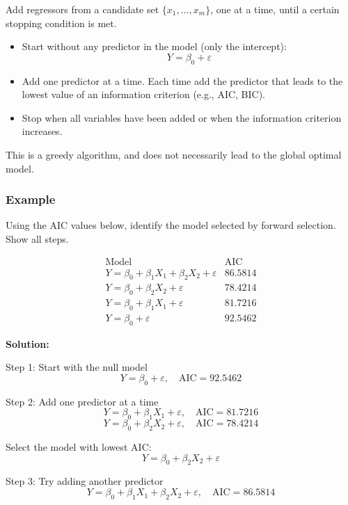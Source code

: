 Add regressors from a candidate set $\{x_1, \dots, x_m\}$, one at a time, until a certain stopping condition is met.

\begin{itemize}
\item Start without any predictor in the model (only the intercept):
\[
Y = \beta_0 + \varepsilon
\]

\item Add one predictor at a time. Each time add the predictor that leads to the lowest value of an information criterion (e.g., AIC, BIC).

\item Stop when all variables have been added or when the information criterion increases.
\end{itemize}

This is a greedy algorithm, and does not necessarily lead to the global optimal model.

\subsubsection*{Example}

Using the AIC values below, identify the model selected by forward selection. Show all steps.

\[
\begin{array}{c|c}
\text{Model} & \text{AIC} \\
\hline
Y = \beta_0 + \beta_1 X_1 + \beta_2 X_2 + \varepsilon & 86.5814 \\
Y = \beta_0 + \beta_2 X_2 + \varepsilon & 78.4214 \\
Y = \beta_0 + \beta_1 X_1 + \varepsilon & 81.7216 \\
Y = \beta_0 + \varepsilon & 92.5462
\end{array}
\]

\textbf{Solution:}

Step 1: Start with the null model
\[
Y = \beta_0 + \varepsilon, \quad \text{AIC} = 92.5462
\]

Step 2: Add one predictor at a time
\[
Y = \beta_0 + \beta_1 X_1 + \varepsilon, \quad \text{AIC} = 81.7216
\]
\[
Y = \beta_0 + \beta_2 X_2 + \varepsilon, \quad \text{AIC} = 78.4214
\]

Select the model with lowest AIC:
\[
Y = \beta_0 + \beta_2 X_2 + \varepsilon
\]

Step 3: Try adding another predictor
\[
Y = \beta_0 + \beta_1 X_1 + \beta_2 X_2 + \varepsilon, \quad \text{AIC} = 86.5814
\]

